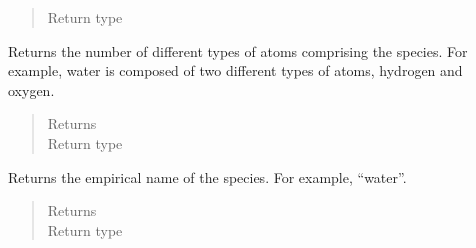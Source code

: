 \documentclass[letterpaper,10pt,openany,oneside,english]{sphinxmanual}
\begin{document}
\begin{fulllineitems}
\begin{fulllineitems}
\begin{quote}
\begin{description}
\item[{Return type}] \leavevmode
{}

\end{description}\end{quote}

\end{fulllineitems}


\begin{fulllineitems}
\label{\detokenize{support_rst/specie:specie.Specie.GetNNuclideTypes}}
Returns the number of different types of atoms comprising the species.
For example, water is composed of two different types of atoms,
hydrogen and oxygen.
\begin{quote}\begin{description}
\item[{Returns}] \leavevmode
{}

\item[{Return type}] \leavevmode
{}

\end{description}\end{quote}

\end{fulllineitems}


\begin{fulllineitems}
\label{\detokenize{support_rst/specie:specie.Specie.GetName}}
Returns the empirical name of the species. For example, “water”.
\begin{quote}\begin{description}
\item[{Returns}] \leavevmode
{}

\item[{Return type}] \leavevmode
{}

\end{description}\end{quote}

\end{fulllineitems}


\end{fulllineitems}
\end{document}
